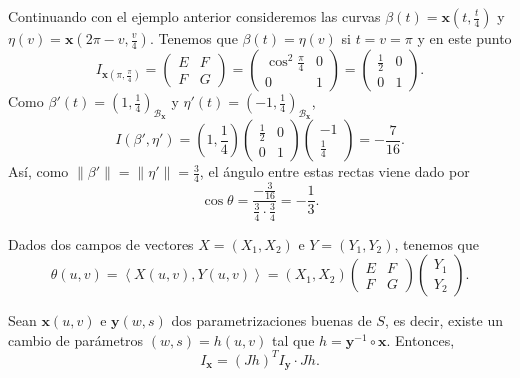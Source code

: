\begin{eg}
Continuando con el ejemplo anterior consideremos las curvas $\displaystyle \beta\left(t\right)= \textbf{x} \left(t, \frac{t}{4}\right) $ y $\displaystyle \eta\left(v\right)= \textbf{x} \left(2\pi-v, \frac{v}{4}\right) $. Tenemos que $\displaystyle \beta\left(t\right)=\eta\left(v\right) $ si $\displaystyle t = v = \pi  $ y en este punto
\[I_{ \textbf{x} \left(\pi , \frac{\pi }{4}\right)}=\begin{pmatrix} E & F \\ F & G \end{pmatrix}=\begin{pmatrix} \cos ^{2}\frac{\pi }{4} & 0 \\ 0 & 1 \end{pmatrix} = \begin{pmatrix} \frac{1}{2} & 0 \\ 0 & 1 \end{pmatrix} .\]
Como $\displaystyle \beta'\left(t\right)=\left(1, \frac{1}{4}\right)_{\mathcal{B}_{ \textbf{x} }} $ y $\displaystyle \eta'\left(t\right)=\left(-1, \frac{1}{4}\right)_{\mathcal{B}_{ \textbf{x} }} $, 
\[I \left(\beta', \eta'\right) = \left(1, \frac{1}{4}\right)\begin{pmatrix} \frac{1}{2} & 0 \\ 0 & 1 \end{pmatrix}\begin{pmatrix} -1 \\ \frac{1}{4} \end{pmatrix} = -\frac{7}{16} .\]
Así, como $\displaystyle \|\beta'\|=\|\eta'\| = \frac{3}{4} $, el ángulo entre estas rectas viene dado por 
\[\cos \theta = \frac{-\frac{3}{16}}{\frac{3}{4} \cdot \frac{3}{4}}=-\frac{1}{3} .\]
\end{eg}
\begin{eg}
	Dados dos campos de vectores $\displaystyle X = \left(X_{1}, X_{2}\right) $ e $\displaystyle Y = \left(Y_{1}, Y_{2}\right) $, tenemos que 
	\[\theta\left(u,v\right)=\left\langle X\left(u,v\right), Y\left(u,v\right) \right\rangle =\left(X_{1}, X_{2}\right)\begin{pmatrix} E & F \\ F & G \end{pmatrix}\begin{pmatrix} Y_{1} \\ Y_{2} \end{pmatrix} .\]
\end{eg}
\begin{prop}
Sean $\displaystyle \textbf{x} \left(u,v\right) $ e $\displaystyle \textbf{y} \left(w,s\right) $ dos parametrizaciones buenas de $\displaystyle S $, es decir, existe un cambio de parámetros $\displaystyle \left(w,s\right)=h\left(u,v\right) $ tal que $\displaystyle h = \textbf{y} ^{-1} \circ \textbf{x}  $. Entonces, 
\[I _{ \textbf{x} } = \left(Jh\right)^{T}I_{ \textbf{y} } \cdot Jh .\]
\end{prop}

